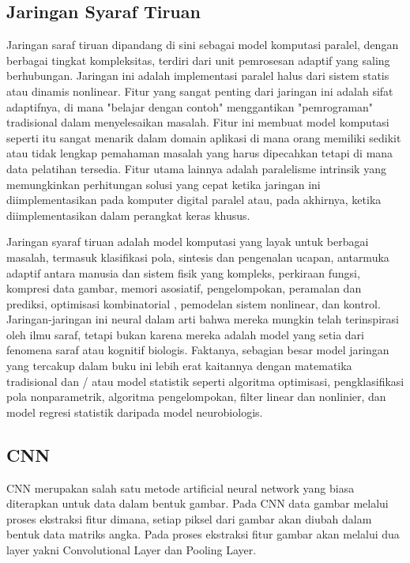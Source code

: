 \documentclass[./skripsi.tex]{subfiles}
\begin{document}
\subsection{Jaringan Syaraf Tiruan}
\par Jaringan saraf tiruan dipandang di sini sebagai model komputasi paralel, dengan berbagai tingkat kompleksitas, terdiri dari unit pemrosesan adaptif yang saling berhubungan. Jaringan ini adalah implementasi paralel halus dari sistem statis atau dinamis nonlinear. Fitur yang sangat penting dari jaringan ini adalah sifat adaptifnya, di mana "belajar dengan contoh" menggantikan "pemrograman" tradisional dalam menyelesaikan masalah. Fitur ini membuat model komputasi seperti itu sangat menarik dalam domain aplikasi di mana orang memiliki sedikit atau tidak lengkap pemahaman masalah yang harus dipecahkan tetapi di mana data pelatihan tersedia. Fitur utama lainnya adalah paralelisme intrinsik yang memungkinkan perhitungan solusi yang cepat ketika jaringan ini diimplementasikan pada komputer digital paralel atau, pada akhirnya, ketika diimplementasikan dalam perangkat keras khusus.
\par Jaringan syaraf tiruan adalah model komputasi yang layak untuk berbagai masalah, termasuk klasifikasi pola, sintesis dan pengenalan ucapan, antarmuka adaptif antara manusia dan sistem fisik yang kompleks, perkiraan fungsi, kompresi data gambar, memori asosiatif, pengelompokan, peramalan dan prediksi, optimisasi kombinatorial , pemodelan sistem nonlinear, dan kontrol. Jaringan-jaringan ini neural dalam arti bahwa mereka mungkin telah terinspirasi oleh ilmu saraf, tetapi bukan karena mereka adalah model yang setia dari fenomena saraf atau kognitif biologis. Faktanya, sebagian besar model jaringan yang tercakup dalam buku ini lebih erat kaitannya dengan matematika tradisional dan / atau model statistik seperti algoritma optimisasi, pengklasifikasi pola nonparametrik, algoritma pengelompokan, filter linear dan nonlinier, dan model regresi statistik daripada model neurobiologis. \cite{hassoun1995fundamentals}
\subsection{CNN}

\par CNN merupakan salah satu metode artificial neural network yang biasa diterapkan untuk data dalam bentuk gambar.
Pada CNN data gambar melalui proses ekstraksi fitur dimana, setiap piksel dari gambar akan diubah dalam bentuk data matriks angka.
Pada proses ekstraksi fitur gambar akan melalui dua layer yakni Convolutional Layer dan Pooling Layer.
\end{document}
